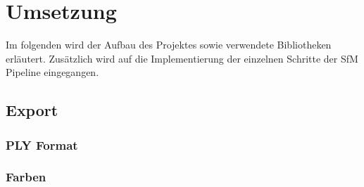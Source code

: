 \chapter{Umsetzung}\label{sec:implementation}
Im folgenden wird der Aufbau des Projektes sowie verwendete Bibliotheken erläutert.
Zusätzlich wird auf die Implementierung der einzelnen Schritte der SfM Pipeline eingegangen.









\section{Export}
\subsection{PLY Format}
\subsection{Farben}


